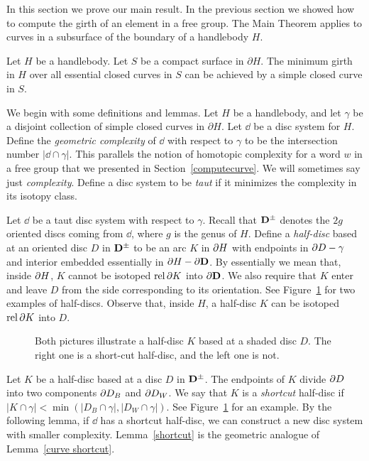 In this section we prove our main result.  In the previous section we showed how to compute the girth of an element in a free group.  The Main Theorem applies to curves in a subsurface of the boundary of a handlebody $H$.

\begin{theorem}
\label{subsurface theorem}
Let $H$ be a handlebody.  Let $S$ be a compact surface in $\partial H$.  The minimum girth in $H$ over all essential closed curves in $S$ can be achieved by a simple closed curve in $S$.
\end{theorem} 

We begin with some definitions and lemmas.  Let $H$ be a handlebody, and let $\gamma$ be a disjoint collection of simple closed curves in $\partial H$.  Let $\dd$ be a disc system for $H$.  Define the \emph{geometric complexity} of $\dd$ with respect to $\gamma$ to be the intersection number $|\dd\cap\gamma|$.  This parallels the notion of homotopic complexity for a word $w$ in a free group that we presented in Section~\ref{computecurve}.  We will sometimes say just \emph{complexity}.  Define a disc system to be \emph{taut} if it minimizes the complexity in its isotopy class.

Let $\dd$ be a taut disc system with respect to $\gamma$.  Recall that $\mathbf{D}^\pm$ denotes the $2g$ oriented discs coming from $\dd$, where $g$ is the genus of $H$.  Define a \emph{half-disc} based at an oriented disc $D$ in $\mathbf{D}^\pm$ to be an arc $K$ in $\partial H$ with endpoints in $\partial D-\gamma$ and interior embedded essentially in $\partial H-\partial \mathbf{D}$.  By essentially we mean that, inside $\partial H$, $K$ cannot be isotoped $\operatorname{rel} \partial K$ into $\partial \mathbf{D}$.  We also require that $K$ enter and leave $D$ from the side corresponding to its orientation.  See Figure~\ref{halfdisc_shortcut} for two examples of half-discs.  Observe that, inside $H$, a half-disc $K$ can be isotoped $\operatorname{rel} \partial K$ into $D$.

\begin{figure}
\caption{Both pictures illustrate a half-disc $K$ based at a shaded disc $D$.  The right one is a short-cut half-disc, and the left one is not.}
\label{halfdisc_shortcut}
\end{figure}
 
Let $K$ be a half-disc based at a disc $D$ in $\mathbf{D}^\pm$.  The endpoints of $K$ divide $\partial D$ into two components $\partial D_B$ and $\partial D_W$.  We say that $K$ is a \emph{shortcut} half-disc if $|K\cap\gamma| < \min(|D_B\cap\gamma|,|D_W\cap\gamma|)$.  See Figure~\ref{halfdisc_shortcut} for an example.  By the following lemma, if $\dd$ has a shortcut half-disc, we can construct a new disc system with smaller complexity.  Lemma~\ref{shortcut} is the geometric analogue of Lemma~\ref{curve shortcut}.

